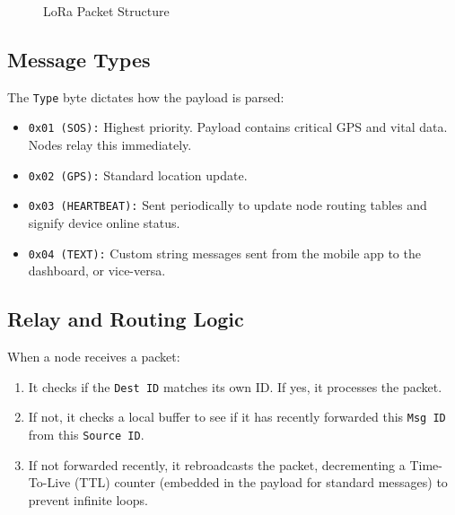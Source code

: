 \begin{figure}[htbp]
    \centering
    \caption{LoRa Packet Structure}
    \label{fig:lora-packet}
\end{figure}

\subsection{Message Types}
The \texttt{Type} byte dictates how the payload is parsed:
\begin{itemize}
    \item \texttt{0x01 (SOS):} Highest priority. Payload contains critical GPS and vital data. Nodes relay this immediately.
    \item \texttt{0x02 (GPS):} Standard location update.
    \item \texttt{0x03 (HEARTBEAT):} Sent periodically to update node routing tables and signify device online status.
    \item \texttt{0x04 (TEXT):} Custom string messages sent from the mobile app to the dashboard, or vice-versa.
\end{itemize}

\subsection{Relay and Routing Logic}
When a node receives a packet:
\begin{enumerate}
    \item It checks if the \texttt{Dest ID} matches its own ID. If yes, it processes the packet.
    \item If not, it checks a local buffer to see if it has recently forwarded this \texttt{Msg ID} from this \texttt{Source ID}.
    \item If not forwarded recently, it rebroadcasts the packet, decrementing a Time-To-Live (TTL) counter (embedded in the payload for standard messages) to prevent infinite loops.
\end{enumerate}

